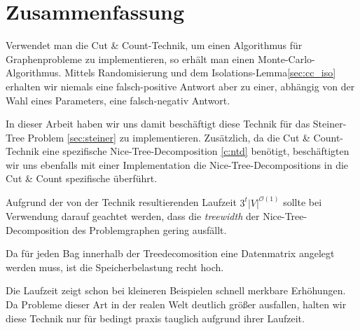 %
%
%
\chapter{Zusammenfassung}
\label{c:summary} %

Verwendet man die Cut \& Count-Technik, um einen Algorithmus für Graphenprobleme zu implementieren, so erhält man einen Monte-Carlo-Algorithmus. Mittels Randomisierung und dem Isolations-Lemma\ref{sec:cc_iso} erhalten wir niemals eine falsch-positive Antwort aber zu einer, abhängig von der Wahl eines Parameters, eine falsch-negativ Antwort. 

In dieser Arbeit haben wir uns damit beschäftigt diese Technik für das Steiner-Tree Problem \ref{sec:steiner} zu implementieren. Zusätzlich, da die Cut \& Count-Technik eine spezifische Nice-Tree-Decomposition \ref{c:ntd} benötigt, beschäftigten wir uns ebenfalls mit einer Implementation die Nice-Tree-Decompositions in die Cut \& Count spezifische überführt.

Aufgrund der von der Technik resultierenden Laufzeit $3^t |V|^{\mathcal{O}(1)}$ sollte bei Verwendung darauf geachtet werden, dass die \textit{treewidth} der Nice-Tree-Decomposition des Problemgraphen gering ausfällt.

Da für jeden Bag innerhalb der Treedecomosition eine Datenmatrix angelegt werden muss, ist die Speicherbelastung recht hoch. 

Die Laufzeit zeigt schon bei kleineren Beispielen schnell merkbare Erhöhungen. Da Probleme dieser Art in der realen Welt deutlich größer ausfallen, halten wir diese Technik nur für bedingt praxis tauglich aufgrund ihrer Laufzeit.  